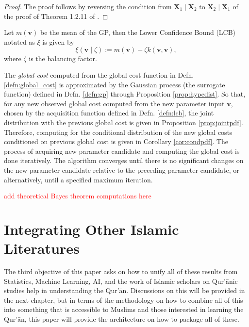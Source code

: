 \begin{proof}
    The proof follows by reversing the condition from $\mathbf{X}_1\mid\mathbf{X}_2$ to $\mathbf{X}_2\mid\mathbf{X}_1$ of the proof of Theorem 1.2.11 of \cite{muirhead2005}.
\end{proof}
\begin{defnx}\label{defn:lcb}
    Let $m(\mathbf{v})$ be the mean of the GP, then the Lower Confidence Bound (LCB) notated as $\xi$ is given by
    \begin{equation}
        \xi(\mathbf{v}\mid\zeta):=m(\mathbf{v})-\zeta k(\mathbf{v},\mathbf{v}),
    \end{equation}
    where $\zeta$ is the balancing factor.
\end{defnx}
The \textit{global cost} computed from the global cost function in Defn. \ref{defn:global_cost} is approximated by the Gaussian process (the surrogate function) defined in Defn. \ref{defn:gp} through Proposition \ref{prop:hypedist}. So that, for any new observed global cost computed from the new parameter input $\mathbf{v}$, chosen by the acquisition function defined in Defn. \ref{defn:lcb}, the joint distribution with the previous global cost is given in Proposition \ref{prop:jointpdf}. Therefore, computing for the conditional distribution of the new global costs conditioned on previous global cost is given in Corollary \ref{cor:condpdf}. The process of acquiring new parameter candidate and computing the global cost is done iteratively. The algorithm converges until there is no significant changes on the new parameter candidate relative to the preceding parameter candidate, or alternatively, until a specified maximum iteration.
\begin{center}
    \textcolor{red}{add theoretical Bayes theorem computations here}
\end{center}
\section{Integrating Other Islamic Literatures}
The third objective of this paper asks on how to unify all of these results from Statistics, Machine Learning, AI, and the work of Islamic scholars on Qur'\=anic studies help in understanding the Qur'\=an. Discussions on this will be provided in the next chapter, but in terms of the methodology on how to combine all of this into something that is accessible to Muslims and those interested in learning the Qur'\=an, this paper will provide the architecture on how to package all of these.

